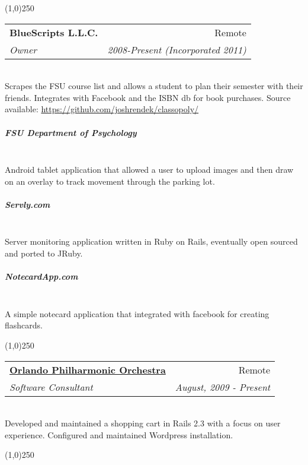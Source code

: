 \documentclass[a4paper,11pt,sans]{article}
\makeatletter
\newcommand{\ressubheading}[4]{
\begin{tabular*}{7.0in}{l@{\extracolsep{\fill}}r}
		\textbf{#1} & #2 \\
		\textit{#3} & \textit{#4} \\
\end{tabular*}\vspace{-6pt}}
\makeatother
\begin{document}
\begin{center}
  \line(1,0){250}
\end{center}

\ressubheading{BlueScripts L.L.C.}{Remote}{Owner}{2008-Present (Incorporated 2011)}

\setlength{\parindent}{15pt}

\hspace{5pt} \\

Scrapes the FSU course list and allows a student to plan their semester with their friends. Integrates with Facebook and the ISBN db for book purchases.
Source available: \url{https://github.com/joshrendek/classopoly/}

\subparagraph{FSU Department of Psychology} \hspace{5pt} \\

Android tablet application that allowed a user to upload images and then draw on an overlay to track movement through the parking lot.

\subparagraph{Servly.com} \hspace{5pt} \\

Server monitoring application written in Ruby on Rails, eventually open sourced and ported to JRuby.

\subparagraph{NotecardApp.com} \hspace{5pt} \\

A simple notecard application that integrated with facebook for creating flashcards.

\setlength{\parindent}{0pt}

\begin{center}
  \line(1,0){250}
\end{center}


\ressubheading{\href{http://orlandophil.org/}{Orlando Philharmonic Orchestra}}{Remote}{Software Consultant}{August, 2009 - Present}

\hspace{5pt} \\

Developed and maintained a shopping cart in Rails 2.3 with a focus on user experience. Configured and maintained Wordpress installation.


\begin{center}
  \line(1,0){250}
\end{center}
\end{document}
